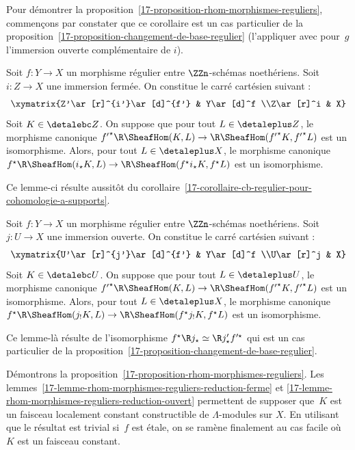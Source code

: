 \documentclass[10pt]{../fichiers-configuration-latex/smfart}
\begin{document}
Pour démontrer la proposition~\ref{17-proposition-rhom-morphismes-reguliers},
commençons par constater que ce corollaire est un cas
particulier de la proposition~\ref{17-proposition-changement-de-base-regulier}
(l'appliquer avec pour $g$ l'immersion ouverte complémentaire de $i$).

\medskip

\begin{lemme2}\label{17-lemme-rhom-morphismes-reguliers-reduction-ferme}
Soit $f\colon Y\to X$ un morphisme régulier
entre $\ZZn$-schémas noethériens. Soit $i\colon Z\to X$ une
immersion fermée. On constitue le carré cartésien suivant :
\[\xymatrix{Z'\ar[r]^{i'}\ar[d]^{f'} & Y\ar[d]^f \\Z\ar[r]^i & X}\]
Soit $K\in \detalebc Z$. On suppose que pour tout $L\in\detaleplus Z$, le
morphisme canonique
${f'}^\star\R\SheafHom(K,L)\to\R\SheafHom({f'}^\star
K,{f'}^\star L)$ est un isomorphisme. Alors, pour tout $L\in\detaleplus X$, le
morphisme canonique $f^\star\R\SheafHom(i_\star K,L)\to
\R\SheafHom(f^\star i_\star K,f^\star L)$ est un isomorphisme.
\end{lemme2}

Ce lemme-ci résulte aussitôt du 
corollaire~\ref{17-corollaire-cb-regulier-pour-cohomologie-a-supports}.

\begin{lemme2}\label{17-lemme-rhom-morphismes-reguliers-reduction-ouvert}
Soit $f\colon Y\to X$ un morphisme régulier
entre $\ZZn$-schémas noethériens. Soit $j\colon U\to X$ une
immersion ouverte. On constitue le carré cartésien suivant :
\[\xymatrix{U'\ar[r]^{j'}\ar[d]^{f'} & Y\ar[d]^f \\U\ar[r]^j & X}\]
Soit $K\in \detalebc U$. On suppose que pour tout $L\in\detaleplus U$, le
morphisme canonique
${f'}^\star\R\SheafHom(K,L)\to\R\SheafHom({f'}^\star
K,{f'}^\star L)$ est un isomorphisme. Alors, pour tout $L\in\detaleplus X$, le
morphisme canonique $f^\star\R\SheafHom(j_! K,L)\to
\R\SheafHom(f^\star j_! K,f^\star L)$ est un isomorphisme.
\end{lemme2}

Ce lemme-là résulte de l'isomorphisme $f^\star \R j_\star \simeq
\R j'_\star f'^\star$ qui est un cas particulier de la 
proposition~\ref{17-proposition-changement-de-base-regulier}.

\bigskip

Démontrons la proposition~\ref{17-proposition-rhom-morphismes-reguliers}.
Les lemmes~\ref{17-lemme-rhom-morphismes-reguliers-reduction-ferme} et 
\ref{17-lemme-rhom-morphismes-reguliers-reduction-ouvert} permettent de
supposer que $K$ est un faisceau localement constant constructible de
$\Lambda$-modules sur $X$. En utilisant que le résultat est
trivial si $f$ est étale, on se ramène finalement au cas facile
où $K$ est un faisceau constant.
\end{document}
